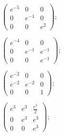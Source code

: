 	\begin{enumsols}

		\item \( \begin{pmatrix} e^{-5} & 0 & 0 \\ 0 & e^{-1} & 0 \\ 0 & 0 & e^{2} \end{pmatrix} \); %
		\item \( \begin{pmatrix} e^{-4} & 0 & 0 \\ 0 & e^{-1} & e^{-1} \\ 0 & 0 & e^{-1} \end{pmatrix} \); %
		\item \( \begin{pmatrix} e^{-2} & 0 & 0 \\ e^{-2} & e^{-2} & 0 \\ 0 & 0 & 1 \end{pmatrix} \); %
		\item \( \begin{pmatrix} e^{3} & e^{3} & \frac{e^{3}}{2} \\ 0 & e^{3} & e^{3} \\ 0 & 0 & e^{3} \end{pmatrix} \); %

\end{enumsols}
